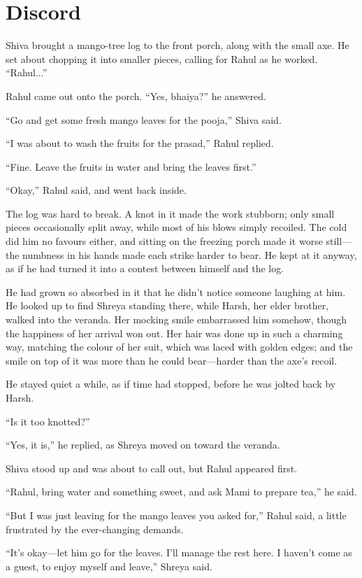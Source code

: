 \chapter{Discord}

Shiva brought a mango-tree log to the front porch, along with the small axe. He set about chopping it into smaller pieces, calling for Rahul as he worked. ``Rahul...''

Rahul came out onto the porch. ``Yes, bhaiya?'' he answered.

``Go and get some fresh mango leaves for the pooja,'' Shiva said.

``I was about to wash the fruits for the prasad,'' Rahul replied.

``Fine. Leave the fruits in water and bring the leaves first.''

``Okay,'' Rahul said, and went back inside.

The log was hard to break. A knot in it made the work stubborn; only small pieces occasionally split away, while most of his blows simply recoiled. The cold did him no favours either, and sitting on the freezing porch made it worse still—the numbness in his hands made each strike harder to bear. He kept at it anyway, as if he had turned it into a contest between himself and the log.

He had grown so absorbed in it that he didn't notice someone laughing at him. He looked up to find Shreya standing there, while Harsh, her elder brother, walked into the veranda. Her mocking smile embarrassed him somehow, though the happiness of her arrival won out. Her hair was done up in such a charming way, matching the colour of her suit, which was laced with golden edges; and the smile on top of it was more than he could bear—harder than the axe's recoil.

He stayed quiet a while, as if time had stopped, before he was jolted back by Harsh.

``Is it too knotted?''

``Yes, it is,'' he replied, as Shreya moved on toward the veranda.

Shiva stood up and was about to call out, but Rahul appeared first.

``Rahul, bring water and something sweet, and ask Mami to prepare tea,'' he said.

``But I was just leaving for the mango leaves you asked for,'' Rahul said, a little frustrated by the ever-changing demands.

``It's okay—let him go for the leaves. I'll manage the rest here. I haven't come as a guest, to enjoy myself and leave,'' Shreya said.

